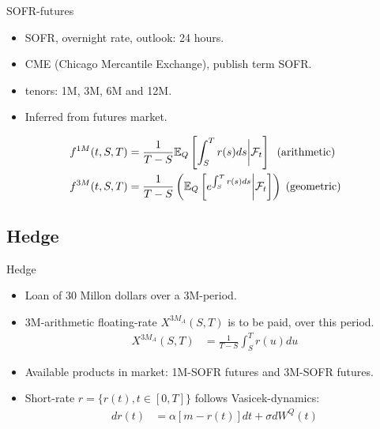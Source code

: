 \documentclass[UKenglish]{beamer}
\newcommand{\E}{\mathbb{E}}  %
\newcommand{\F}{\mathcal{F}} %
\begin{document}
\begin{frame}{SOFR-futures}
\begin{itemize}
    \item SOFR, overnight rate, outlook: 24 hours. 
    \item CME (Chicago Mercantile Exchange), publish term SOFR. 
    \item tenors: 1M, 3M, 6M and 12M. 
    \item Inferred from futures market. 
\end{itemize}


\begin{definition}
\begin{align*}
f^{1M}(t,S,T) &= \frac{1}{T-S}\E_{Q}\left[
\int_{S}^{T}r(s)ds\bigg{|}\F_{t}
\right]\;\;(\text{arithmetic}) \\ 
f^{3M}(t,S,T) &= \frac{1}{T-S}\left(
\E_{Q}\left[
e^{\int_{S}^{T}r(s)ds}\bigg{|}\F_{t}
\right]
\right)\;(\text{geometric})
\end{align*}    
\end{definition}
\end{frame}

\subsection{Hedge}

\begin{frame}{Hedge}
\begin{itemize}
    \item Loan of 30 Millon dollars over a 3M-period. 
    \item 3M-arithmetic floating-rate $X^{3M_{A}}(S,T)$ is to be paid, over this period. 
    \begin{align*}
    X^{3M_{A}}(S,T) &= \frac{1}{T-S}\int_{S}^{T}r(u)du
    \end{align*}
    \item Available products in market: 1M-SOFR futures and 3M-SOFR futures. 
    \item Short-rate $r = \{r(t), t\in [0,T]\}$ follows Vasicek-dynamics: 
    \begin{align*}
     dr(t) &= \alpha[m-r(t)]dt + \sigma dW^{Q}(t)   
    \end{align*}
\end{itemize}
\end{frame} 
\end{document}

